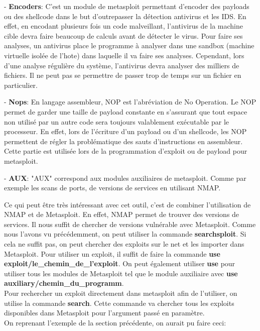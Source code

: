 - \textbf{Encoders}: C'est un module de metasploit permettant d'encoder des payloads ou des shellcode dans le but d'outrepasser la détection antivirus et les IDS. En effet, en encodant plusieurs fois un code malveillant, l'antivirus de la machine cible devra faire beaucoup de calculs avant de détecter le virus. Pour faire ses analyses, un antivirus place le programme à analyser dans une sandbox (machine virtuelle isolée de l'hote) dans laquelle il va faire ses analyses. Cependant, lors d’une analyse régulière du système, l’antivirus devra analyser des milliers de fichiers. Il ne peut pas se permettre de passer trop de temps sur un fichier en particulier.

- \textbf{Nops}: En langage assembleur, NOP est l'abréviation de No Operation. Le NOP permet de garder une taille de payload constante en s'assurant que tout espace non utilisé par un autre code sera toujours valablement exécutable par le processeur. En effet, lors de l'écriture d'un payload ou d'un shellcode, les NOP permettent de régler la problématique des sauts d'instructions en assembleur. Cette partie est utilisée lors de la programmation d'exploit ou de payload pour metasploit.

- \textbf{AUX}: "AUX" correspond aux modules auxiliaires de metasploit. Comme par exemple les scans de ports, de versions de services en utilisant NMAP.

Ce qui peut être très intéressant avec cet outil, c'est de combiner l'utilisation de NMAP et de Metasploit. En effet, NMAP permet de trouver des versions de services. Il nous suffit de chercher de versions vulnérable avec Metasploit. Comme nous l'avons vu précédemment, on peut utiliser la commande \textbf{searchsploit}. Si cela ne suffit pas, on peut chercher des exploits sur le net et les importer dans Metasploit. Pour utiliser un exploit, il suffit de faire la commande \textbf{use exploit/le\_chemin\_de\_l'exploit}. On peut également utiliser \textbf{use} pour utiliser tous les modules de Metasploit tel que le module auxiliaire avec \textbf{use auxiliary/chemin\_du\_programm}.\\

Pour rechercher un exploit directement dans metasploit afin de l'utiliser, on utilise la commande \textbf{search}. Cette commande va chercher tous les exploits disponibles dans Metasploit pour l'argument passé en paramètre.\\ 

\noindent On reprenant l'exemple de la section précédente, on aurait pu faire ceci:

